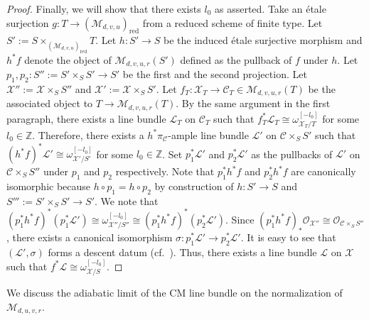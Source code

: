 \documentclass[12pt,twoside]{amsart}
\theoremstyle{definition}
\begin{document}
\begin{proof}
  Finally, we will show that there exists $l_0$ as asserted.
  Take an \'etale surjection $g\colon T\to (\mathcal{M}_{d,v,u})_{\mathrm{red}}$ from a reduced scheme of finite type.
  Let $S':=S\times_{(\mathcal{M}_{d,v,u})_{\mathrm{red}}}T$.
     Let $h\colon S'\to S$ be the induced \'etale surjective morphism and $h^*f$ denote the object of $\mathcal{M}_{d,v,u,r}(S')$ defined as the pullback of $f$ under $h$.
   Let $p_1,p_2\colon S'':=S'\times_SS'\to S'$ be the first and the second projection. 
   Let $\mathcal{X}'':=\mathcal{X}\times_SS''$ and $\mathcal{X}':=\mathcal{X}\times_SS'$. 
Let $f_T\colon \mathcal{X}_T\to \mathcal{C}_T\in \mathcal{M}_{d,v,u,r}(T)$ be the associated object to $T\to \mathcal{M}_{d,v,u,r}(T)$. 
      By the same argument in the first paragraph, there exists a line bundle $\mathscr{L}_T$ on $\mathcal{C}_T$ such that $f_T^*\mathscr{L}_T\cong \omega_{\mathcal{X}_T/T}^{[-l_0]}$ for some $l_0\in\mathbb{Z}$.
      Therefore, there exists a $h^*\pi_{\mathcal{C}}$-ample line bundle $\mathscr{L}'$ on $\mathcal{C}\times_SS'$ such that $(h^*f)^*\mathscr{L}'\cong \omega_{\mathcal{X}'/S'}^{[-l_0]}$ for some $l_0\in\mathbb{Z}$. 
      Set $p_1^*\mathscr{L}'$ and $p_2^*\mathscr{L}'$ as the pullbacks of $\mathscr{L}'$ on $\mathcal{C}\times_SS''$ under $p_1$ and $p_2$ respectively.
      Note that $p_1^*h^*f$ and $p_2^*h^*f$ are canonically isomorphic because $h \circ p_{1}= h \circ p_{2}$ by construction of $h \colon S' \to S$ and $S''':=S'\times_SS'\to S'$.
      We note that $(p_1^*h^*f)^*(p_1^*\mathscr{L}')\cong\omega_{\mathcal{X}''/S''}^{[-l_0]} \cong (p_1^*h^*f)^*(p_2^*\mathscr{L}')$. 
      Since $(p_1^*h^*f)_*\mathcal{O}_{\mathcal{X}''}\cong\mathcal{O}_{\mathcal{C}\times_SS''}$, there exists a canonical isomorphism $\sigma\colon p_1^*\mathscr{L}'\to p_2^*\mathscr{L}'$.
      It is easy to see that $(\mathscr{L}',\sigma)$ forms a descent datum (cf.~\cite[Remark 2.10]{HH}).
      Thus, there exists a line bundle $\mathscr{L}$ on $\mathcal{X}$ such that $f^*\mathscr{L}\cong\omega_{\mathcal{X}/S}^{[-l_0]}$.
        \end{proof}


We discuss the adiabatic limit of the CM line bundle on the normalization of $\mathcal{M}_{d,u,v,r}$.
\end{document}
